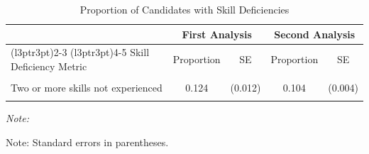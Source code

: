 \begin{table}[!h]
\centering
\caption{Proportion of Candidates with Skill Deficiencies}
\centering
\begin{threeparttable}
\begin{tabular}[t]{lcccc}
\toprule
\multicolumn{1}{c}{ } & \multicolumn{2}{c}{First Analysis} & \multicolumn{2}{c}{Second Analysis} \\
\cmidrule(l{3pt}r{3pt}){2-3} \cmidrule(l{3pt}r{3pt}){4-5}
Skill Deficiency Metric & Proportion & SE & Proportion & SE\\
\midrule
\cellcolor{gray!10}{One or more skills not experienced} & \cellcolor{gray!10}{0.213} & \cellcolor{gray!10}{(0.015)} & \cellcolor{gray!10}{0.216} & \cellcolor{gray!10}{(0.005)}\\
Two or more skills not experienced & 0.124 & (0.012) & 0.104 & (0.004)\\
\cellcolor{gray!10}{Three skills not experienced} & \cellcolor{gray!10}{0.075} & \cellcolor{gray!10}{(0.010)} & \cellcolor{gray!10}{0.052} & \cellcolor{gray!10}{(0.003)}\\
\bottomrule
\end{tabular}
\begin{tablenotes}
\item \textit{Note: } 
\item Note: Standard errors in parentheses.
\end{tablenotes}
\end{threeparttable}
\end{table}